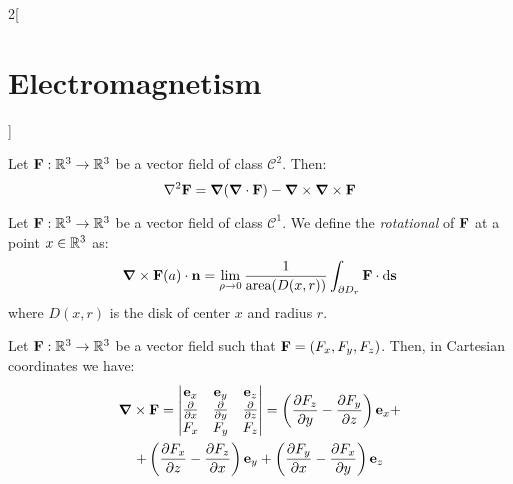 \documentclass[../../../main.tex]{subfiles}
\begin{document}
\begin{multicols}{2}[\section{Electromagnetism}]
  \begin{definition}
    Let  $\boldsymbol{\mathrm{F}}:\mathbb{R}^3\rightarrow\mathbb{R}^3$ be a vector field of class $\mathcal{C}^2$. Then: $$\laplacian\vf{F}=\grad(\divp\vf{F})-\rotp\rotp\vf{F}$$
  \end{definition}
  \begin{definition}[Rotational]
    Let $\boldsymbol{\mathrm{F}}:\mathbb{R}^3\rightarrow\mathbb{R}^3$ be a vector field of class $\mathcal{C}^1$. We define the \emph{rotational} of $\boldsymbol{\mathrm{F}}$ at a point $x\in\mathbb{R}^3$ as:
    $$\boldsymbol{\mathrm{\nabla}}\times\boldsymbol{\mathrm{F}}(a)\cdot\boldsymbol{\mathrm{n}}=\lim_{\rho\to 0}\frac{1}{\text{area}(D(x,r))}\int_{\partial D_r}\boldsymbol{\mathrm{F}}\cdot \dd \boldsymbol{\mathrm{s}}$$
    where $D(x,r)$ is the disk of center $x$ and radius $r$.
  \end{definition}
  \begin{prop}
    Let $\boldsymbol{\mathrm{F}}:\mathbb{R}^3\rightarrow\mathbb{R}^3$ be a vector field such that $\boldsymbol{\mathrm{F}}=(F_x,F_y,F_z)$. Then, in Cartesian coordinates we have:
    \begin{multline*}
      \boldsymbol{\mathrm{\nabla}}\times \boldsymbol{\mathrm{F}}=
      \begin{vmatrix}
        \boldsymbol{\mathrm{e}}_x  & \boldsymbol{\mathrm{e}}_y  & \boldsymbol{\mathrm{e}}_z  \\
        \pdv{}{x} & \pdv{}{y} & \pdv{}{z} \\
        F_x       & F_y       & F_z       \\
      \end{vmatrix} = \left(\frac{\partial F_z}{\partial y}-\frac{\partial F_y}{\partial z}\right)\boldsymbol{\mathrm{e}}_x+\\+\left(\frac{\partial F_x}{\partial z}-\frac{\partial F_z}{\partial x}\right)\boldsymbol{\mathrm{e}}_y+\left(\frac{\partial F_y}{\partial x}-\frac{\partial F_x}{\partial y}\right)\boldsymbol{\mathrm{e}}_z
    \end{multline*}
  \end{prop}

\end{multicols}
\end{document}
